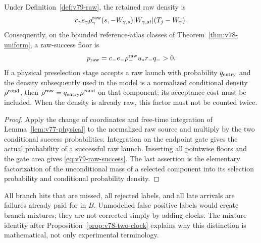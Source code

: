 \begin{proposition}
\label{prop:v79-raw-cost}
Under Definition~\ref{def:v79-raw}, the retained raw density is
\[
 c_\gamma e_\gamma\rho_\gamma^{\rm raw}
        (s,-W_{\gamma,s})|W_{\gamma,st}|(T_j-W_\gamma).
\]
Consequently, on the bounded reference-atlas classes of
Theorem~\ref{thm:v78-uniform}, a raw-success floor is
\begin{equation}\label{eq:v79-raw-success}
 p_{\rm raw}=c_-e_-\rho_-^{\rm raw}u_*r_-q_->0.
\end{equation}
If a physical preselection stage accepts a raw launch with probability
$q_{\rm entry}$ and the density subsequently used in the model is a
normalized conditional density $\rho^{\rm cond}$, then
$\rho^{\rm raw}=q_{\rm entry}\rho^{\rm cond}$ on that component;
its acceptance cost must be included.  When the density is already
raw, this factor must not be counted twice.
\end{proposition}
\begin{proof}
Apply the change of coordinates and free-time integration of
Lemma~\ref{lem:v77-physical} to the normalized raw source and multiply
by the two conditional success probabilities.  Integration on the
endpoint gate gives the actual probability of a successful raw launch.
Inserting all pointwise floors and the gate area gives
\eqref{eq:v79-raw-success}.  The last assertion is the elementary
factorization of the unconditional mass of a selected component into
its selection probability and conditional probability density.
\end{proof}

All branch hits that are missed, all rejected labels, and all late
arrivals are failures already paid for in $B$.  Unmodelled false positive
labels would create branch mixtures; they are not corrected simply by
adding clocks.  The mixture identity after
Proposition~\ref{prop:v78-two-clock} explains why this distinction is
mathematical, not only experimental terminology.

